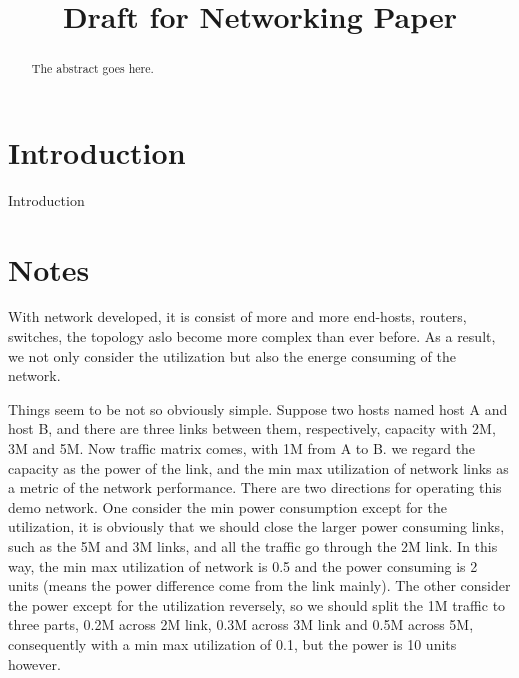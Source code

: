 \documentclass[conference]{IEEEtran}
\begin{document}
\title{Draft for Networking Paper}


\author{
\and
{}
\and
{}
}


\maketitle

\begin{abstract}
The abstract goes here.
\end{abstract}

\IEEEpeerreviewmaketitle

\section{Introduction}
Introduction


\section{Notes}
With network developed, it is consist of more and more end-hosts, routers, switches, the topology aslo become more
complex than ever before. As a result, we not only consider the utilization but also the energe consuming of the network.

Things seem to be not so obviously simple. Suppose two hosts named host A and host B, and there are three links between them,
respectively, capacity with 2M, 3M and 5M. Now traffic matrix comes, with 1M from A to B. we regard the capacity as the power
of the link, and the min max utilization of network links as a metric of the network performance. There are two 
directions for operating this demo network. One consider the min power consumption except for the utilization, 
it is obviously that we should close the larger power consuming links, such as the 5M and 3M links, and all the traffic 
go through the 2M link. In this way, the min max utilization of network is 0.5 and the power consuming is 2 units 
(means the power difference come from the link mainly). The other consider the power except for the utilization reversely,
so we should split the 1M traffic to three parts, 0.2M across 2M link, 0.3M across 3M link and 0.5M across 5M, consequently with 
a min max utilization of 0.1, but the power is 10 units however.
\end{document}
